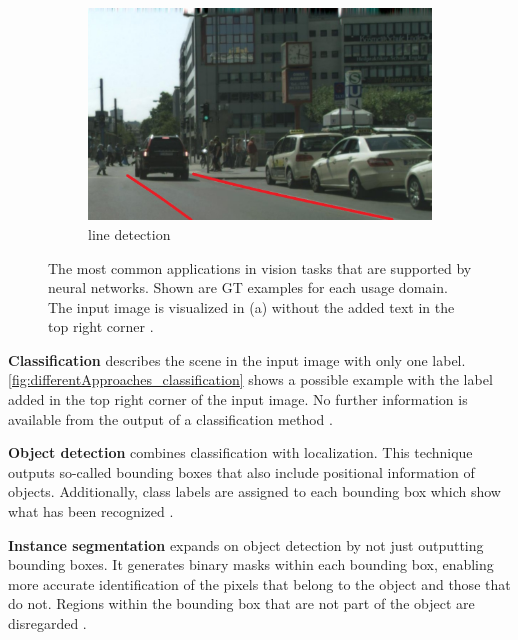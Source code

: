 \begin{figure}[H]
    \hfill
    \begin{subfigure}{0.328\textwidth}
        \includegraphics[width=\linewidth]{PICs/differentApproaches/line_detection.jpg}
        \caption{line detection}
        \label{fig:differentApproaches_line_detection}
    \end{subfigure}

    \caption{The most common applications in vision tasks that are supported by neural networks. Shown are \ac{GT} examples for each usage domain. The input image is visualized in (a) without the added text in the top right corner \cite{panopticsegmentation2019}.}
    \label{fig:differentApproaches}
\end{figure}

\noindent\textbf{Classification} describes the scene in the input image with only one label.
\autoref{fig:differentApproaches_classification} shows a possible example with the label added in the top right corner of the input image.
No further information is available from the output of a classification method \cite{cifar100}.

\vspace{1cm} %

\noindent\textbf{Object detection} combines classification with localization.
This technique outputs so-called bounding boxes that also include positional information of objects.
Additionally, class labels are assigned to each bounding box which show what has been recognized \cite{panopticsegmentation2019}.

\vspace{1cm} %

\noindent\textbf{Instance segmentation} expands on object detection by not just outputting bounding boxes.
It generates binary masks within each bounding box, enabling more accurate identification of the pixels that belong to the object and those that do not.
Regions within the bounding box that are not part of the object are disregarded \cite{panopticsegmentation2019}.

